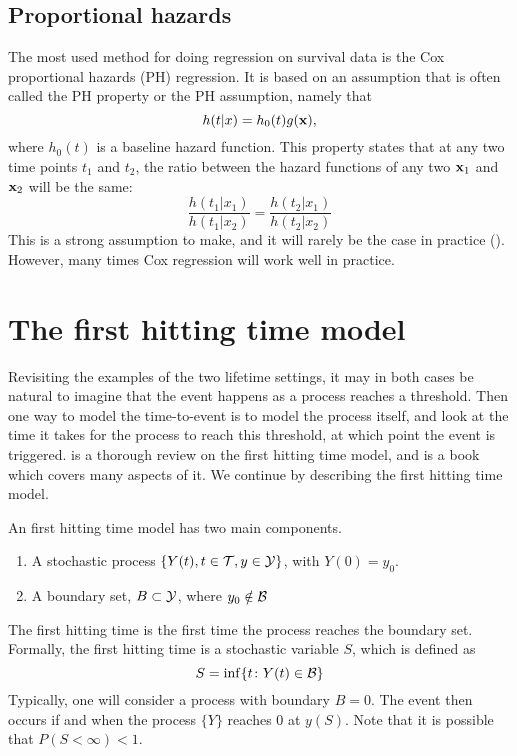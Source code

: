 \subsection{Proportional hazards}
The most used method for doing regression on survival data is the Cox proportional hazards (PH) regression. It is based on an assumption that is often called the PH property or the PH assumption, namely that
\begin{equation}
    h(t|x)=h_0(t)g(\mathbf{x}),
\end{equation}
where $h_0(t)$ is a baseline hazard function.  This property states that at any two time points $t_1$ and $t_2$, the ratio between the hazard functions of any two $\mathbf{x}_1$ and $\mathbf{x}_2$ will be the same:
\begin{equation}
    \frac{h(t_1|x_1)}{h(t_1|x_2)}=\frac{h(t_2|x_1)}{h(t_2|x_2)}
\end{equation}
This is a strong assumption to make, and it will rarely be the case in practice (\cite{lee2010}). However, many times Cox regression will work well in practice. 

\section{The first hitting time model}\label{sec:fht}
Revisiting the examples of the two lifetime settings, it may in both cases be natural to imagine that the event happens as a process reaches a threshold. Then one way to model the time-to-event is to model the process itself, and look at the time it takes for the process to reach this threshold, at which point the event is triggered. \cite{lee2006} is a thorough review on the first hitting time model, and \cite{caroni2017} is a book which covers many aspects of it. We continue by describing the first hitting time model.

An first hitting time model has two main components.
\begin{enumerate}
    \item A stochastic process $\{Y(t), t\in\mathcal{T},y\in\mathcal{Y}\}$, with $Y(0)=y_0$.
    \item A boundary set, $B\subset \mathcal{Y}$, where $y_0\notin\mathcal{B}$
\end{enumerate}
The first hitting time is the first time the process reaches the boundary set. Formally, the first hitting time is a stochastic variable $S$, which is defined as
\[
    S = \inf\{t\colon Y(t)\in\mathcal{B}\}
\]
Typically, one will consider a process with boundary $B=0$. The event then occurs if and when the process $\{Y\}$ reaches 0 at $y(S)$. Note that it is possible that $P(S<\infty)<1$.

